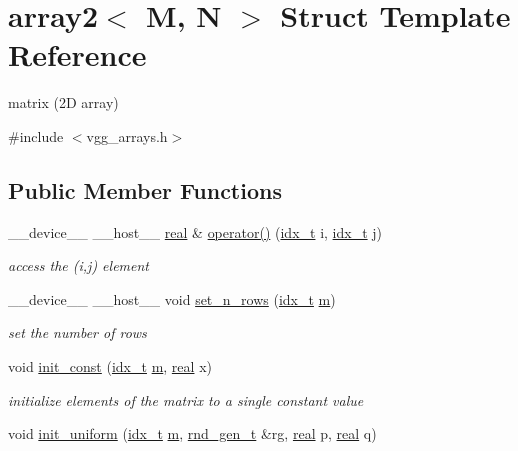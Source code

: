 \hypertarget{structarray2}{}\section{array2$<$ M, N $>$ Struct Template Reference}
\label{structarray2}


matrix (2D array)  




{\ttfamily \#include $<$vgg\+\_\+arrays.\+h$>$}

\subsection*{Public Member Functions}
\begin{DoxyCompactItemize}
\item 
\+\_\+\+\_\+device\+\_\+\+\_\+ \+\_\+\+\_\+host\+\_\+\+\_\+ \hyperlink{vgg__util_8h_a1082d08aaa761215ec83e7149f27ad16}{real} \& \hyperlink{structarray2_a9761bc289064a82cf623fe12e37e2d90}{operator()} (\hyperlink{vgg__util_8h_a8e93478a00e685bea5e6a3f617bf03a3}{idx\+\_\+t} i, \hyperlink{vgg__util_8h_a8e93478a00e685bea5e6a3f617bf03a3}{idx\+\_\+t} j)
\begin{DoxyCompactList}\small\item\em access the (i,j) element \end{DoxyCompactList}\item 
\+\_\+\+\_\+device\+\_\+\+\_\+ \+\_\+\+\_\+host\+\_\+\+\_\+ void \hyperlink{structarray2_aec446c19505f98e9e59907c5ecf726a1}{set\+\_\+n\+\_\+rows} (\hyperlink{vgg__util_8h_a8e93478a00e685bea5e6a3f617bf03a3}{idx\+\_\+t} \hyperlink{structarray2_ae14313ec7a12d47e3654d69ca47391bd}{m})
\begin{DoxyCompactList}\small\item\em set the number of rows \end{DoxyCompactList}\item 
void \hyperlink{structarray2_a4a4af5c54d1e18ef867abe8a9e6b8226}{init\+\_\+const} (\hyperlink{vgg__util_8h_a8e93478a00e685bea5e6a3f617bf03a3}{idx\+\_\+t} \hyperlink{structarray2_ae14313ec7a12d47e3654d69ca47391bd}{m}, \hyperlink{vgg__util_8h_a1082d08aaa761215ec83e7149f27ad16}{real} x)
\begin{DoxyCompactList}\small\item\em initialize elements of the matrix to a single constant value \end{DoxyCompactList}\item 
void \hyperlink{structarray2_a7c5bbd2c546339982291f51bb727943b}{init\+\_\+uniform} (\hyperlink{vgg__util_8h_a8e93478a00e685bea5e6a3f617bf03a3}{idx\+\_\+t} \hyperlink{structarray2_ae14313ec7a12d47e3654d69ca47391bd}{m}, \hyperlink{structrnd__gen__t}{rnd\+\_\+gen\+\_\+t} \&rg, \hyperlink{vgg__util_8h_a1082d08aaa761215ec83e7149f27ad16}{real} p, \hyperlink{vgg__util_8h_a1082d08aaa761215ec83e7149f27ad16}{real} q)

\end{DoxyCompactItemize}
